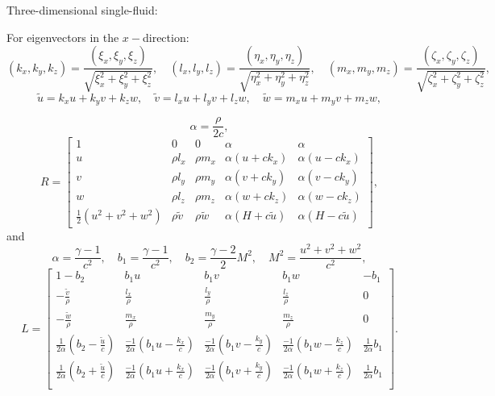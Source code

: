 Three-\/dimensional single-\/fluid\+:

For eigenvectors in the $x-$direction\+: \[ \begin{equation*} (k_x,k_y,k_z)=\frac{(\xi_x,\xi_y,\xi_z)}{\sqrt{\xi_x^2+\xi_y^2+\xi_z^2}},\quad (l_x,l_y,l_z)=\frac{(\eta_x,\eta_y,\eta_z)}{\sqrt{\eta_x^2+\eta_y^2+\eta_z^2}},\quad (m_x,m_y,m_z)=\frac{(\zeta_x,\zeta_y,\zeta_z)}{\sqrt{\zeta_x^2+\zeta_y^2+\zeta_z^2}}, \end{equation*} \] \[ \begin{equation*} \tilde{u}=k_x u+k_y v+k_z w, \quad \tilde{v}=l_x u+l_y v+l_z w, \quad \tilde{w}=m_x u+m_y v+m_z w, \end{equation*} \]

\[ \begin{equation*} \alpha= \frac{\rho}{2c}, \end{equation*} \] \[ \begin{equation*} R= \begin{bmatrix} 1 & 0 & 0 & \alpha & \alpha \\ u & \rho l_x& \rho m_x & \alpha (u+c k_x) & \alpha (u-c k_x) \\ v & \rho l_y & \rho m_y & \alpha (v+c k_y) & \alpha (v-c k_y) \\ w & \rho l_z & \rho m_z & \alpha (w+c k_z) & \alpha (w-c k_z) \\ \frac{1}{2}(u^2+v^2+w^2) & \rho \tilde{v} & \rho \tilde{w} &\alpha (H+c \tilde{u}) & \alpha (H-c \tilde{u} ) \end{bmatrix}, \end{equation*} \] and \[ \begin{equation*} \alpha=\frac{\gamma-1}{c^2}, \quad b_1=\frac{\gamma -1}{c^2}, \quad b_2= \frac{\gamma -2}{2}M^2, \quad M^2=\frac{u^2+v^2+w^2}{c^2}, \end{equation*} \] \[ \begin{equation*} L= \begin{bmatrix} 1-b_2 & b_1 u & b_1 v & b_1 w & -b_1 \\ -\frac{\tilde{v}}{\rho} & \frac{l_x}{\rho}& \frac{l_y}{\rho}& \frac{l_z}{\rho} & 0\\ -\frac{\tilde{w}}{\rho} & \frac{m_x}{\rho}& \frac{m_y}{\rho}& \frac{m_z}{\rho} & 0\\ \frac{1}{2\alpha}\left(b_2-\frac{\tilde{u}}{c}\right)& \frac{-1}{2\alpha}\left(b_1u-\frac{k_x}{c}\right)& \frac{-1}{2\alpha}\left(b_1v-\frac{k_y}{c}\right) & \frac{-1}{2\alpha}\left(b_1w-\frac{k_z}{c}\right) & \frac{1}{2\alpha}b_1\\ \frac{1}{2\alpha}\left(b_2+\frac{\tilde{u}}{c}\right)& \frac{-1}{2\alpha}\left(b_1u+\frac{k_x}{c}\right)& \frac{-1}{2\alpha}\left(b_1v+\frac{k_y}{c}\right) & \frac{-1}{2\alpha}\left(b_1w+\frac{k_z}{c}\right) & \frac{1}{2\alpha}b_1\\ \end{bmatrix}. \end{equation*} \]


